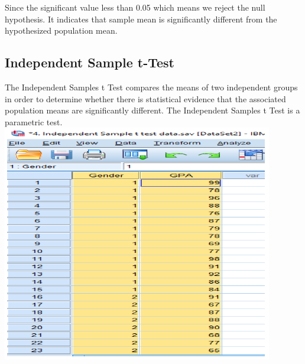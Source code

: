 \documentclass[
  letterpaper,
  DIV=11,
  numbers=noendperiod]{scrreprt}
\begin{document}
\begin{tcolorbox}[enhanced jigsaw, rightrule=.15mm, arc=.35mm, colframe=quarto-callout-note-color-frame, coltitle=black, left=2mm, colbacktitle=quarto-callout-note-color!10!white, bottomtitle=1mm, titlerule=0mm, colback=white, breakable, opacitybacktitle=0.6, opacityback=0, toprule=.15mm, toptitle=1mm, title=\textcolor{quarto-callout-note-color}{\faInfo}\hspace{0.5em}{Decision}, bottomrule=.15mm, leftrule=.75mm]

Since the significant value less than 0.05 which means we reject the
null hypothesis. It indicates that sample mean is significantly
different from the hypothesized population mean.

\end{tcolorbox}

\subsection{Independent Sample t-Test}\label{independent-sample-t-test}

The Independent Samples t Test compares the means of two independent
groups in order to determine whether there is statistical evidence that
the associated population means are significantly different. The
Independent Samples t Test is a parametric test.\\

\includegraphics{images/ind-t-test.png}
\end{document}
